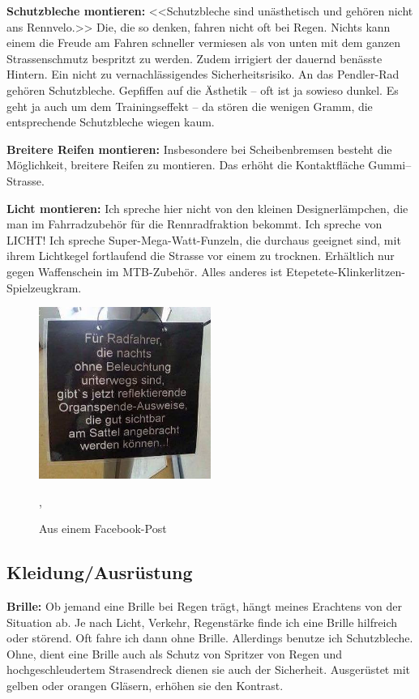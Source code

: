 \textbf{Schutzbleche montieren:}
<<Schutzbleche sind unästhetisch und gehören nicht ans Rennvelo.>>
Die, die so denken, fahren nicht oft bei Regen.
Nichts kann einem die Freude am Fahren schneller vermiesen als von unten mit dem ganzen Strassenschmutz bespritzt zu werden.
Zudem irrigiert der dauernd benässte Hintern. Ein nicht zu vernachlässigendes Sicherheitsrisiko.
An das Pendler-Rad gehören Schutzbleche.
Gepfiffen auf die Ästhetik -- oft ist ja sowieso dunkel.
Es geht ja auch um dem Trainingseffekt -- da stören die wenigen Gramm, die entsprechende Schutzbleche wiegen kaum.

\textbf{Breitere Reifen montieren:} 
Insbesondere bei Scheibenbremsen besteht die Möglichkeit, breitere Reifen zu montieren.
Das erhöht die Kontaktfläche Gummi--Strasse.

\textbf{Licht montieren:}
Ich spreche hier nicht von den kleinen Designerlämpchen, die man im Fahrradzubehör für die Rennradfraktion bekommt.
Ich spreche von LICHT!
Ich spreche Super-Mega-Watt-Funzeln, die durchaus geeignet sind, mit ihrem Lichtkegel fortlaufend die Strasse vor einem zu trocknen.
Erhältlich nur gegen Waffenschein im MTB-Zubehör.
Alles anderes ist Etepetete-Klinkerlitzen-Spielzeugkram.

\begin{figure}[<+htpb+>]
  \centering
  \includegraphics[width=0.5\textwidth]{figures/ohne-beleuchtung.jpg}
  \caption{Aus einem Facebook-Post \protect\cite{officepony2016organspendeausweis}},
  \label{fig:ohne-beleuchtung}
\end{figure}


\subsection{Kleidung/Ausrüstung}

\textbf{Brille:}
Ob jemand eine Brille bei Regen trägt, hängt meines Erachtens von der Situation ab.
Je nach Licht, Verkehr, Regenstärke finde ich eine Brille hilfreich oder störend.
Oft fahre ich dann ohne Brille.
Allerdings benutze ich Schutzbleche.
Ohne, dient eine Brille auch als Schutz von Spritzer von Regen und hochgeschleudertem Strasendreck dienen sie auch der Sicherheit.
Ausgerüstet mit gelben oder orangen Gläsern, erhöhen sie den Kontrast.

